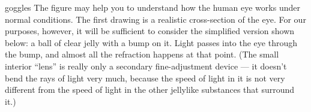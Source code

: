 \begin{hwsection}
\begin{hw}{goggles}
The figure may help you to understand how the human eye works under normal conditions.
The first drawing is a realistic cross-section of the eye.
For our purposes, however, it will be sufficient to consider the simplified version shown
below: a ball of clear jelly with a bump on it. Light passes into the
eye through the bump, and almost all the refraction happens at that point. (The small
interior ``lens'' is really only a secondary fine-adjustment device --- it doesn't bend the rays
of light very much, because the speed of light in it is not very different from the speed of
light in the other jellylike substances that surround it.)
\end{hw}


\end{hwsection}


